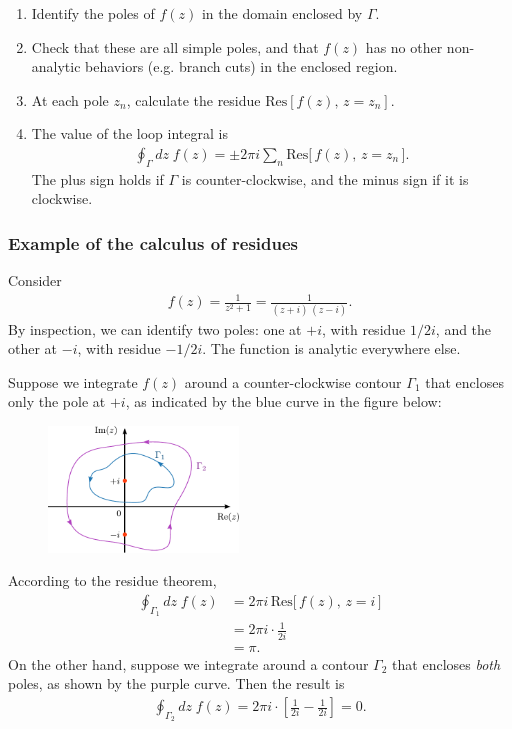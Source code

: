 \documentclass[10pt,a4paper]{article}
\begin{document}
\begin{enumerate}
\item Identify the poles of $f(z)$ in the domain enclosed by $\Gamma$.

\item Check that these are all simple poles, and that $f(z)$ has no other non-analytic behaviors (e.g. branch cuts) in the enclosed region.

\item At each pole $z_n$, calculate the residue $\mathrm{Res}[f(z),\, z = z_n]$.

\item The value of the loop integral is
  \begin{align}
    \oint_\Gamma dz\; f(z) = \pm 2\pi i \sum_n \mathrm{Res}\big[\,f(z),\,z = z_n\,\big].
  \end{align}
  The plus sign holds if $\Gamma$ is counter-clockwise, and the minus
  sign if it is clockwise.
\end{enumerate}

\subsubsection{Example of the calculus of residues}
\label{residues-example}

Consider
\begin{align}
  f(z) = \frac{1}{z^2 + 1} = \frac{1}{(z + i)\,(z-i)}.
\end{align}
By inspection, we can identify two poles: one at $+i$, with residue
$1/2i$, and the other at $-i$, with residue $-1/2i$. The function is
analytic everywhere else.

Suppose we integrate $f(z)$ around a counter-clockwise contour
$\Gamma_1$ that encloses only the pole at $+i$, as indicated by the
blue curve in the figure below:

\begin{figure}[ht]
  \centering\includegraphics[width=0.45\textwidth]{contour_example1}
\end{figure}

\clearpage
According to the residue theorem,
\begin{align}
  \oint_{\Gamma_1}dz \; f(z) &= 2\pi i\, \mathrm{Res}\big[\,f(z),\,z = i\,\big] \\
  &= 2\pi i \cdot \frac{1}{2i} \\
  & = \pi.
\end{align}
On the other hand, suppose we integrate around a contour $\Gamma_2$
that encloses \textit{both} poles, as shown by the purple curve. Then
the result is
\begin{align}
  \oint_{\Gamma_2}dz \; f(z) = 2\pi i \cdot \left[\frac{1}{2i} - \frac{1}{2i}\right] = 0.
\end{align}
\end{document}
